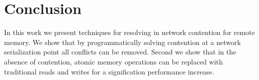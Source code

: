 \section{Conclusion}

In this work we present techniques for resolving in network contention for
remote memory. We show that by programmatically solving contention at a network
serialization point all conflicts can be removed. Second we show that in the
absence of contention, atomic memory operations can be replaced with traditional
reads and writes for a signification performance increase.